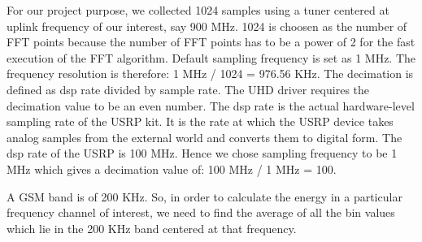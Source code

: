 For our project purpose, we collected 1024 samples using a tuner centered at 
uplink frequency of our interest, say 900 MHz. 1024 is choosen as the number of 
FFT points because the number of FFT points has to be a power of 2 for the fast 
execution of the FFT algorithm. Default  sampling frequency is set as 1 MHz. 
The frequency resolution is therefore: 1 MHz / 1024 = 976.56 KHz. The 
decimation is defined as dsp rate divided by sample rate. The UHD driver 
requires the decimation value to be an even number. The dsp rate is the actual 
hardware-level sampling rate of the USRP kit. It is the rate at which the USRP 
device takes analog samples from the external world and converts them to digital
form. The dsp rate of the USRP is 100 MHz. Hence we chose sampling frequency to 
be 1 MHz which gives a decimation value of: 100 MHz / 1 MHz = 100.

A GSM band is of 200 KHz. So, in order to calculate the energy in a particular
frequency channel of interest, we need to find the average of all the bin values
which lie in the 200 KHz band centered at that frequency.